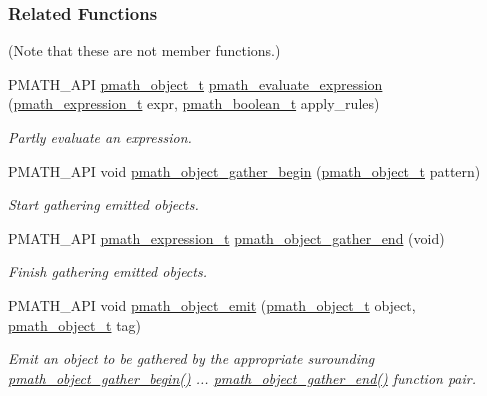 \subsubsection*{Related Functions}
(Note that these are not member functions.) \begin{CompactItemize}
\item 
PMATH\_\-API \hyperlink{classpmath__object__t}{pmath\_\-object\_\-t} \hyperlink{classpmath__expression__t_cbcaa73e8ae48c8798da28f8fbc59cfd}{pmath\_\-evaluate\_\-expression} (\hyperlink{classpmath__expression__t}{pmath\_\-expression\_\-t} expr, \hyperlink{group__general__types_g8e45b3972d0a6a89b2b45eb9eae6d8f7}{pmath\_\-boolean\_\-t} apply\_\-rules)
\begin{CompactList}\small\item\em Partly evaluate an expression. \item\end{CompactList}\item 
PMATH\_\-API void \hyperlink{group__helpers_g191ffdccf982321cb55d97c3f37af106}{pmath\_\-object\_\-gather\_\-begin} (\hyperlink{classpmath__object__t}{pmath\_\-object\_\-t} pattern)
\begin{CompactList}\small\item\em Start gathering emitted objects. \item\end{CompactList}\item 
PMATH\_\-API \hyperlink{classpmath__expression__t}{pmath\_\-expression\_\-t} \hyperlink{group__helpers_g6c69ddaa79a2599aa602510bd12a5df4}{pmath\_\-object\_\-gather\_\-end} (void)
\begin{CompactList}\small\item\em Finish gathering emitted objects. \item\end{CompactList}\item 
PMATH\_\-API void \hyperlink{group__helpers_g1349f6136b7b99695f2b315cae24da5e}{pmath\_\-object\_\-emit} (\hyperlink{classpmath__object__t}{pmath\_\-object\_\-t} object, \hyperlink{classpmath__object__t}{pmath\_\-object\_\-t} tag)
\begin{CompactList}\small\item\em Emit an object to be gathered by the appropriate surounding \hyperlink{group__helpers_g191ffdccf982321cb55d97c3f37af106}{pmath\_\-object\_\-gather\_\-begin()} ... \hyperlink{group__helpers_g6c69ddaa79a2599aa602510bd12a5df4}{pmath\_\-object\_\-gather\_\-end()} function pair. \item\end{CompactList}\item 

\end{CompactItemize}
